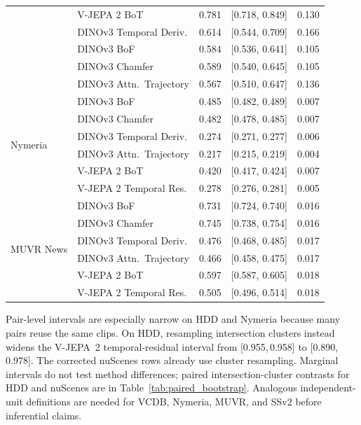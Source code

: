 \documentclass{article}
\theoremstyle{remark}
\begin{document}
\begin{table}[h]
\begin{tabular}{llccc}
 & V-JEPA 2 BoT             & 0.781 & [0.718, 0.849] & 0.130 \\
 & DINOv3 Temporal Deriv.   & 0.614 & [0.544, 0.709] & 0.166 \\
 & DINOv3 BoF               & 0.584 & [0.536, 0.641] & 0.105 \\
 & DINOv3 Chamfer           & 0.589 & [0.540, 0.645] & 0.105 \\
 & DINOv3 Attn.\ Trajectory & 0.567 & [0.510, 0.647] & 0.136 \\
\midrule
\multirow{6}{*}{Nymeria}
 & DINOv3 BoF               & 0.485 & [0.482, 0.489] & 0.007 \\
 & DINOv3 Chamfer           & 0.482 & [0.478, 0.485] & 0.007 \\
 & DINOv3 Temporal Deriv.   & 0.274 & [0.271, 0.277] & 0.006 \\
 & DINOv3 Attn.\ Trajectory & 0.217 & [0.215, 0.219] & 0.004 \\
 & V-JEPA 2 BoT             & 0.420 & [0.417, 0.424] & 0.007 \\
 & V-JEPA 2 Temporal Res.   & 0.278 & [0.276, 0.281] & 0.005 \\
\midrule
\multirow{6}{*}{MUVR News}
 & DINOv3 BoF               & 0.731 & [0.724, 0.740] & 0.016 \\
 & DINOv3 Chamfer           & 0.745 & [0.738, 0.754] & 0.016 \\
 & DINOv3 Temporal Deriv.   & 0.476 & [0.468, 0.485] & 0.017 \\
 & DINOv3 Attn.\ Trajectory & 0.466 & [0.458, 0.475] & 0.017 \\
 & V-JEPA 2 BoT             & 0.597 & [0.587, 0.605] & 0.018 \\
 & V-JEPA 2 Temporal Res.   & 0.505 & [0.496, 0.514] & 0.018 \\
\bottomrule
\end{tabular}
\begin{flushleft}
\small Pair-level intervals are especially narrow on HDD and Nymeria because many pairs reuse the same clips. On HDD, resampling intersection clusters instead widens the V-JEPA~2 temporal-residual interval from [0.955,\,0.958] to [0.890,\,0.978]. The corrected nuScenes rows already use cluster resampling. Marginal intervals do not test method differences; paired intersection-cluster contrasts for HDD and nuScenes are in Table~\ref{tab:paired_bootstrap}. Analogous independent-unit definitions are needed for VCDB, Nymeria, MUVR, and SSv2 before inferential claims.
\end{flushleft}
\end{table}
\end{document}
